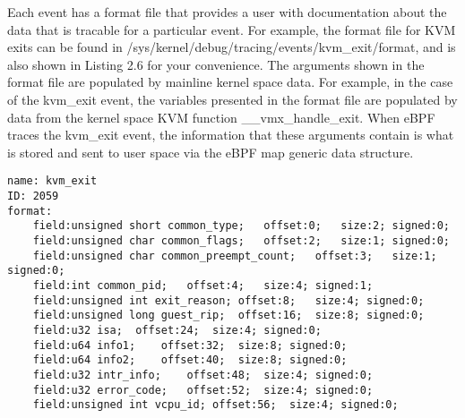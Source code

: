 \documentclass{report}
\begin{document}
\begin{spacing}{1.5}
{\large
Each event has a format file that provides a user with documentation about the data that is tracable for a particular event. For example, the format file for KVM exits can be found in /sys/kernel/debug/tracing/events/kvm\_exit/format, and is also shown in Listing 2.6 for your convenience. The arguments shown in the format file are populated by mainline kernel space data. For example, in the case of the kvm\_exit event, the variables presented in the format file are populated by data from the kernel space KVM function \_\_vmx\_handle\_exit. When eBPF traces the kvm\_exit event, the information that these arguments contain is what is stored and sent to user space via the eBPF map generic data structure.
\newline

\leavevmode\newline

\begin{lstlisting}[caption={Format File for the kvm\_exit Linux Kernel Tracepoint Event | Linux kernel V5.18.8},captionpos=b]
name: kvm_exit
ID: 2059
format:
    field:unsigned short common_type;   offset:0;   size:2; signed:0;
    field:unsigned char common_flags;   offset:2;   size:1; signed:0;
    field:unsigned char common_preempt_count;   offset:3;   size:1; signed:0;
    field:int common_pid;   offset:4;   size:4; signed:1;
    field:unsigned int exit_reason; offset:8;   size:4; signed:0;
    field:unsigned long guest_rip;  offset:16;  size:8; signed:0;
    field:u32 isa;  offset:24;  size:4; signed:0;
    field:u64 info1;    offset:32;  size:8; signed:0;
    field:u64 info2;    offset:40;  size:8; signed:0;
    field:u32 intr_info;    offset:48;  size:4; signed:0;
    field:u32 error_code;   offset:52;  size:4; signed:0;
    field:unsigned int vcpu_id; offset:56;  size:4; signed:0;
\end{lstlisting}
}






\end{spacing}
\end{document}
